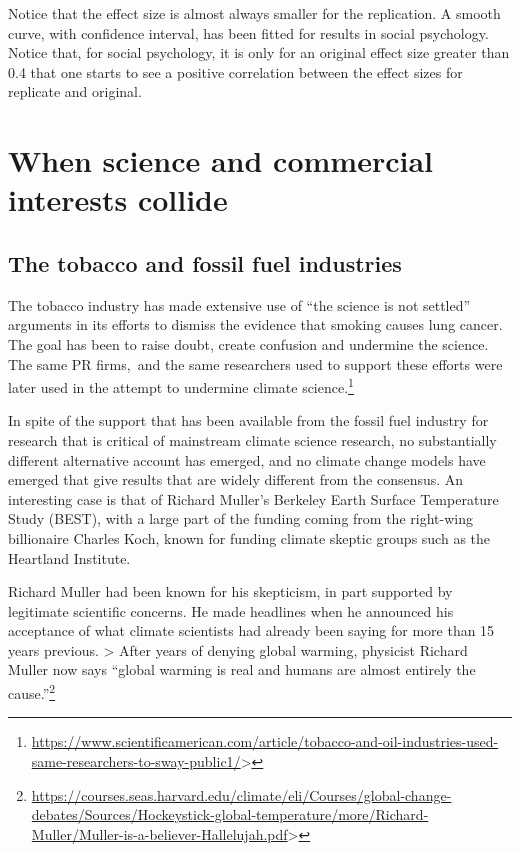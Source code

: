 \documentclass[
  10pt,
  b5paper]{book}
\begin{document}
Notice that the effect size is almost always smaller for
the replication. A smooth curve, with confidence interval,
has been fitted for results in social psychology. Notice
that, for social psychology, it is only for an original
effect size greater than 0.4 that one starts to see a
positive correlation between the effect sizes for replicate
and original.

\hypertarget{when-science-and-commercial-interests-collide}{%
\section{When science and commercial interests collide}\label{when-science-and-commercial-interests-collide}}

\hypertarget{the-tobacco-and-fossil-fuel-industries}{%
\subsection*{The tobacco and fossil fuel industries}\label{the-tobacco-and-fossil-fuel-industries}}

The tobacco industry has made extensive use of ``the science is not settled''
arguments in its efforts to dismiss the evidence that smoking causes lung cancer.
The goal has been to raise doubt, create confusion and undermine the science.
The same PR firms,~and the same researchers used to support these efforts
were later used in the attempt to undermine climate science.\footnote{\url{https://www.scientificamerican.com/article/tobacco-and-oil-industries-used-same-researchers-to-sway-public1/}\textgreater{}}

In spite of the support that has been available from the fossil
fuel industry for research that is critical of mainstream climate science
research, no substantially different alternative account has emerged, and
no climate change models have emerged that give results that are widely
different from the consensus. An interesting case is that of
Richard Muller's Berkeley Earth Surface Temperature Study (BEST),
with a large part of the funding coming from the right-wing billionaire
Charles Koch, known for funding climate skeptic groups such as the
Heartland Institute.

Richard Muller had been known for his skepticism, in part supported
by legitimate scientific concerns. He made headlines when he announced
his acceptance of what climate scientists had already been saying
for more than 15 years previous.
\textgreater{} After years of denying global warming, physicist Richard Muller now says ``global warming is real and humans are almost entirely the cause.''\footnote{\url{https://courses.seas.harvard.edu/climate/eli/Courses/global-change-debates/Sources/Hockeystick-global-temperature/more/Richard-Muller/Muller-is-a-believer-Hallelujah.pdf}\textgreater{}}
\end{document}
